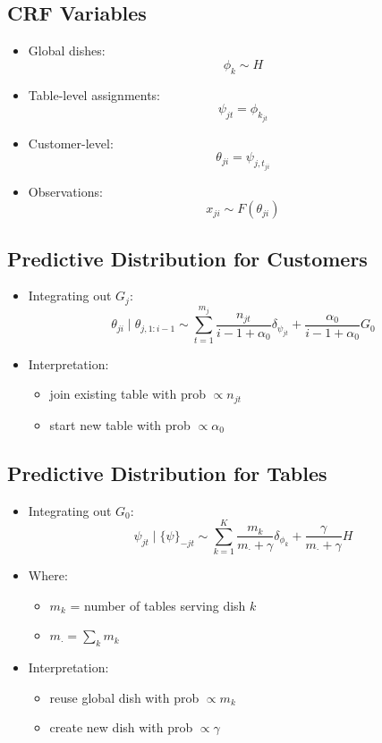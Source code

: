 \documentclass[12pt,oneside]{book}
\numberwithin{equation}{section}
\theoremstyle{definition}
\theoremstyle{plain}
\theoremstyle{remark}
\begin{document}
\subsection*{CRF Variables}

\begin{itemize}
\item Global dishes:
\[
\phi_k \sim H
\]

\item Table-level assignments:
\[
\psi_{jt} = \phi_{k_{jt}}
\]

\item Customer-level:
\[
\theta_{ji} = \psi_{j,t_{ji}}
\]

\item Observations:
\[
x_{ji} \sim F(\theta_{ji})
\]
\end{itemize}

\subsection*{Predictive Distribution for Customers}

\begin{itemize}
\item Integrating out $G_j$:
\[
\theta_{ji} \mid \theta_{j,1:i-1} \sim \sum_{t=1}^{m_j} \frac{n_{jt}}{i-1+\alpha_0}\delta_{\psi_{jt}} + \frac{\alpha_0}{i-1+\alpha_0} G_0
\]

\item Interpretation:
\begin{itemize}
\item join existing table with prob $\propto n_{jt}$
\item start new table with prob $\propto \alpha_0$
\end{itemize}
\end{itemize}

\subsection*{Predictive Distribution for Tables}

\begin{itemize}
\item Integrating out $G_0$:
\[
\psi_{jt} \mid \{\psi\}_{-jt} \sim \sum_{k=1}^{K} \frac{m_k}{m_{\cdot}+\gamma}\delta_{\phi_k} + \frac{\gamma}{m_{\cdot}+\gamma} H
\]

\item Where:
\begin{itemize}
\item $m_k$ = number of tables serving dish $k$
\item $m_{\cdot} = \sum_k m_k$
\end{itemize}

\item Interpretation:
\begin{itemize}
\item reuse global dish with prob $\propto m_k$
\item create new dish with prob $\propto \gamma$
\end{itemize}
\end{itemize}
\end{document}
